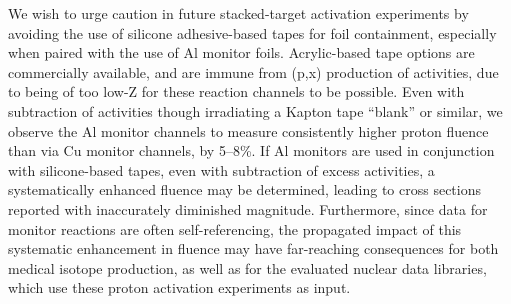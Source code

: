 % 
% 
% 
% 
% 
% 
% 





We wish to urge caution in future stacked-target activation experiments by avoiding the use of silicone adhesive-based tapes for foil containment, especially when paired with the use of Al monitor foils.
Acrylic-based tape options are commercially available, and are immune from (p,x) production of  activities, due to being of too low-Z for these reaction channels to be possible.
Even with subtraction of  activities though irradiating a Kapton tape \enquote{blank} or similar, we observe the Al monitor channels to measure consistently higher proton fluence than via Cu monitor channels, by 5--8\%. 
If Al monitors are used in conjunction with silicone-based tapes, even with subtraction of excess  activities, a systematically enhanced fluence may be determined, leading to cross sections reported with inaccurately diminished magnitude.
Furthermore, since data for monitor reactions are often self-referencing, the propagated impact of this systematic enhancement in fluence may have far-reaching consequences for both medical isotope production, as well as for  the evaluated nuclear data libraries, which use these proton activation experiments as input.

% 


